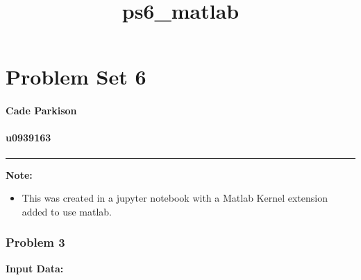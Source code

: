 \documentclass[11pt]{article}
\title{ps6\_matlab}
\providecommand{\tightlist}{%
      \setlength{\itemsep}{0pt}\setlength{\parskip}{0pt}}
\begin{document}
    
    
    \maketitle
    
    

    
    \section{Problem Set 6}\label{problem-set-6}

\paragraph{Cade Parkison}\label{cade-parkison}

\paragraph{u0939163}\label{u0939163}

\begin{center}\rule{0.5\linewidth}{\linethickness}\end{center}

    \textbf{Note:}

\begin{itemize}
\tightlist
\item
  This was created in a jupyter notebook with a Matlab Kernel extension
  added to use matlab.
\end{itemize}

    \subsubsection{Problem 3}\label{problem-3}

\textbf{Input Data:}
\end{document}
